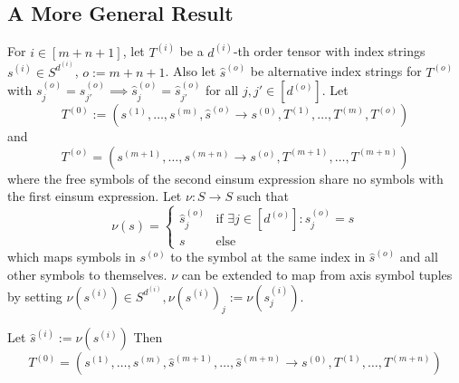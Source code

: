 \subsection{A More General Result}

\begin{theorem}
    For $i \in [m + n + 1]$, let $T^{(i)}$ be a $d^{(i)}$-th order tensor with index strings $s^{(i)} \in S^{d^{(i)}}$, $o := m + n + 1$.
    Also let $\hat{s}^{(o)}$ be alternative index strings for $T^{(o)}$ with $s^{(o)}_j = s^{(o)}_{j'} \implies \hat{s}^{(o)}_j = \hat{s}^{(o)}_{j'}$ for all $j, j' \in [d^{(o)}]$.
    Let
    $$T^{(0)} := (s^{(1)},\dots,s^{(m)}, \hat{s}^{(o)} \rightarrow s^{(0)}, T^{(1)},\dots,T^{(m)}, T^{(o)})$$
    and
    $$T^{(o)} = (s^{(m + 1)},\dots,s^{(m + n)} \rightarrow s^{(o)}, T^{(m + 1)},\dots,T^{(m + n)})$$
    where the free symbols of the second einsum expression share no symbols with the first einsum expression.
    Let $\nu: S \rightarrow S$ such that
    $$\nu(s) = \begin{cases}
            \hat{s}^{(o)}_j & \text{if }\exists j \in [d^{(o)}]: s^{(o)}_j = s \\
            s               & \text{else}
        \end{cases}$$
    which maps symbols in $s^{(o)}$ to the symbol at the same index in $\hat{s}^{(o)}$ and all other symbols to themselves.
    $\nu$ can be extended to map from axis symbol tuples by setting $\nu(s^{(i)}) \in S^{d^{(i)}}, \nu(s^{(i)})_j := \nu(s^{(i)}_j)$.

    Let $\hat{s}^{(i)} := \nu(s^{(i)})$
    Then
    $$T^{(0)} = (s^{(1)},\dots,s^{(m)}, \hat{s}^{(m + 1)}, \dots, \hat{s}^{(m + n)} \rightarrow s^{(0)}, T^{(1)},\dots,T^{(m + n)})$$
\end{theorem}
